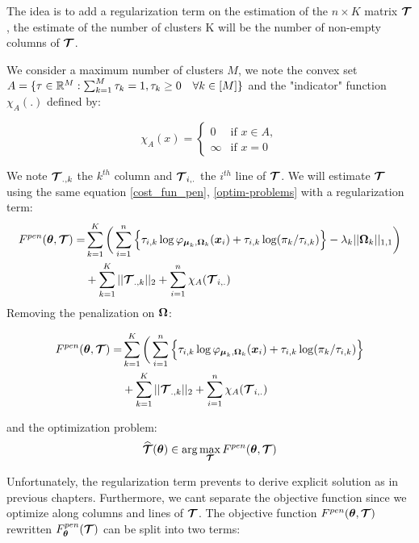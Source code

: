The idea is to add a regularization term on the estimation of the $n\times K$ matrix $\boldsymbol{\mathcal T}$, the estimate of the number of clusters K will be the number of non-empty columns of $\boldsymbol{\mathcal T}$.\

We consider a maximum number of clusters $M$, we note the convex set $A=\{\tau \in {\mathbb R}^M : \sum_{k=1}^M\tau_k=1, \tau_k\geq 0 \quad \forall k \in [M] \}$ and the "indicator" function $\chi_A(.)$ defined by:


  \begin{equation*}
    \chi_A(x) =
    \begin{cases}
      0 & \text{if } x \in A,\\
      	\infty & \text{if } x = 0
    \end{cases}
\end{equation*}

We note $\boldsymbol{\mathcal T}_{.,k}$ the $k^{th}$ column and $\boldsymbol{\mathcal T}_{i,.}$ the $i^{th}$ line of $\boldsymbol{\mathcal T}$. We will estimate $\boldsymbol{\mathcal T}$ using the same equation \ref{cost_fun_pen}, \ref{optim-problems} with a regularization term:\\
\begin{align*}
F^{pen}({\boldsymbol\theta},\boldsymbol{\mathcal T})  =& \sum_{k=1}^K \bigg(\sum_{i=1}^{n} \Big\{\tau_{i,k}\log\varphi_{\boldsymbol\mu_{k},\boldsymbol\Omega_{k}}(\boldsymbol x_i)+\tau_{i,k}
    \log(\pi_k/\tau_{i,k})\Big\}-\lambda_k||\boldsymbol\Omega_k||_{1,1}\bigg)\\ 
    &+ \sum_{k=1}^K ||\boldsymbol{\mathcal T}_{.,k}||_{2} + \sum_{i=1}^{n} \chi_A(\boldsymbol{\mathcal T}_{i,.})
\end{align*}
Removing the penalization on $\boldsymbol\Omega$:

\begin{align*}
F^{pen}({\boldsymbol\theta},\boldsymbol{\mathcal T})  =& \sum_{k=1}^K \bigg(\sum_{i=1}^{n} \Big\{\tau_{i,k}\log\varphi_{\boldsymbol\mu_{k},\boldsymbol\Omega_{k}}(\boldsymbol x_i)+\tau_{i,k}
    \log(\pi_k/\tau_{i,k})\Big\}\\ 
    &+ \sum_{k=1}^K ||\boldsymbol{\mathcal T}_{.,k}||_{2} + \sum_{i=1}^{n} \chi_A(\boldsymbol{\mathcal T}_{i,.})
\end{align*}

 and the optimization problem:
\begin{equation}
\widehat{\boldsymbol{\mathcal T}}({\boldsymbol\theta})\in \arg\max_{\boldsymbol{\mathcal T}} F^{pen}({\boldsymbol\theta},\boldsymbol{\mathcal T})
\end{equation}

Unfortunately, the regularization term prevents to derive explicit solution as in previous chapters. Furthermore, we cant separate the objective function since we optimize along columns and lines of $\boldsymbol{\mathcal T}$. The objective function $F^{pen}({\boldsymbol\theta},\boldsymbol{\mathcal T})$ rewritten
$F^{pen}_{{\boldsymbol\theta}}(\boldsymbol{\mathcal T})$ can be split into two terms:

